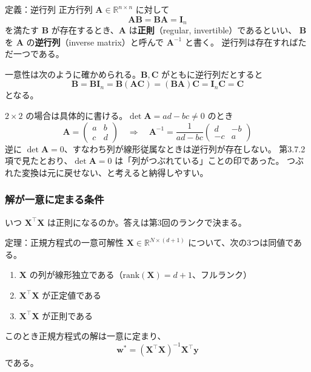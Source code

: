 \begin{itembox}[l]{定義：逆行列}
正方行列 $\bm{A} \in \mathbb{R}^{n \times n}$ に対して
\begin{equation}
  \bm{A}\bm{B} = \bm{B}\bm{A} = \bm{I}_n
\end{equation}
を満たす $\bm{B}$ が存在するとき、$\bm{A}$ は\textbf{正則}（regular, invertible）であるといい、
$\bm{B}$ を $\bm{A}$ の\textbf{逆行列}（inverse matrix）と呼んで $\bm{A}^{-1}$ と書く。
逆行列は存在すればただ一つである。
\end{itembox}

一意性は次のように確かめられる。$\bm{B}, \bm{C}$ がともに逆行列だとすると
\begin{equation*}
  \bm{B} = \bm{B}\bm{I}_n = \bm{B}(\bm{A}\bm{C}) = (\bm{B}\bm{A})\bm{C} = \bm{I}_n\bm{C} = \bm{C}
\end{equation*}
となる。

$2\times2$ の場合は具体的に書ける。$\det\bm{A} = ad - bc \neq 0$ のとき
\begin{equation}
  \bm{A} = \begin{pmatrix} a & b \\ c & d \end{pmatrix}
  \quad \Longrightarrow \quad
  \bm{A}^{-1} = \frac{1}{ad - bc} \begin{pmatrix} d & -b \\ -c & a \end{pmatrix}
  \label{eq:inv2}
\end{equation}
逆に $\det\bm{A} = 0$、すなわち列が線形従属なときは逆行列が存在しない。
第3.7.2項で見たとおり、$\det\bm{A} = 0$ は「列がつぶれている」ことの印であった。
つぶれた変換は元に戻せない、と考えると納得しやすい。

\subsubsection{解が一意に定まる条件}

いつ $\bm{X}^\top\bm{X}$ は正則になるのか。答えは第3回のランクで決まる。

\begin{itembox}[l]{定理：正規方程式の一意可解性}
$\bm{X} \in \mathbb{R}^{N \times (d+1)}$ について、次の3つは同値である。
\begin{enumerate}
  \item $\bm{X}$ の列が線形独立である（$\mathrm{rank}(\bm{X}) = d+1$、フルランク）
  \item $\bm{X}^\top\bm{X}$ が正定値である
  \item $\bm{X}^\top\bm{X}$ が正則である
\end{enumerate}
このとき正規方程式の解は一意に定まり、
\begin{equation}
  \bm{w}^* = (\bm{X}^\top\bm{X})^{-1}\bm{X}^\top\bm{y}
  \label{eq:ls-solution}
\end{equation}
である。
\end{itembox}

